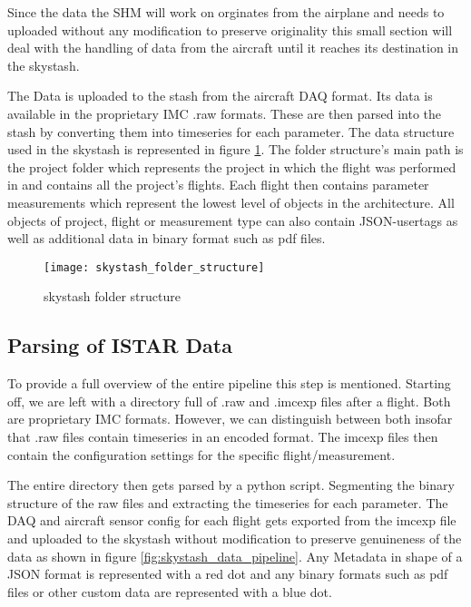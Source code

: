 Since the data the SHM will work on orginates from the airplane and needs to uploaded without any modification to preserve originality this small section will deal with the handling of data from the aircraft until it reaches its destination in the skystash.

The Data is uploaded to the stash from the aircraft DAQ format. Its data is available in the proprietary  IMC .raw formats. These are then parsed into the stash by converting them into timeseries for each parameter. The data structure used in the skystash is represented in figure \ref{fig:skystash_folder_structure}. The folder structure's main path is the project folder which represents the project in which the flight was performed in and contains all the project's flights. Each flight then contains parameter measurements which represent the lowest level of objects in the architecture. All objects of project, flight or measurement type can also contain JSON-usertags as well as additional data in binary format such as pdf files.

\begin{figure}
    \centering
    \texttt{[image: skystash\_folder\_structure]}
    \caption{skystash folder structure}
    \label{fig:skystash_folder_structure}
\end{figure}


\subsection{Parsing of ISTAR Data}


To provide a full overview of the entire pipeline this step is mentioned. Starting off, we are left with a directory full of .raw and .imcexp files after a flight. Both are proprietary IMC formats. However, we can distinguish between both insofar that .raw files contain timeseries in an encoded format. The imcexp files then contain the configuration settings for the specific flight/measurement.

The entire directory then gets parsed by a python script. Segmenting the binary structure of the raw files and extracting the timeseries for each parameter.
The DAQ and aircraft sensor config for each flight gets exported from the imcexp file and uploaded to the skystash without modification to preserve genuineness of the data as shown in figure \ref{fig:skystash_data_pipeline}. Any Metadata in shape of a JSON format is represented with a red dot and any binary formats such as pdf files or other custom data are represented with a blue dot.

